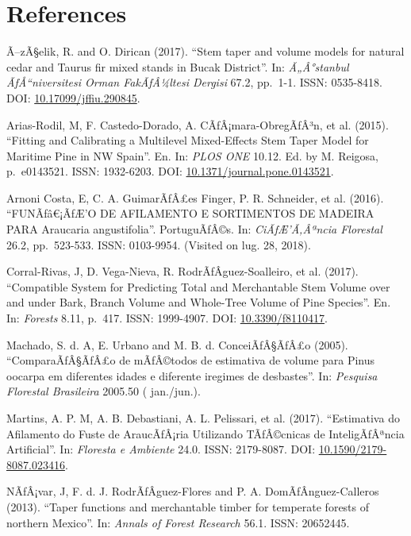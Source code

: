 \documentclass[]{article}
\begin{document}
\clearpage

\hypertarget{references}{%
\section{References}\label{references}}

Ã--zÃ§elik, R. and O. Dirican (2017). ``Stem taper and volume models for
natural cedar and Taurus fir mixed stands in Bucak District''. In:
\emph{Ã„Â°stanbul ÃƒÅ``niversitesi Orman FakÃƒÂ¼ltesi Dergisi} 67.2,
pp.~1-1. ISSN: 0535-8418. DOI:
\href{https://doi.org/10.17099/jffiu.290845}{10.17099/jffiu.290845}.

Arias-Rodil, M, F. Castedo-Dorado, A. CÃƒÂ¡mara-ObregÃƒÂ³n, et al.
(2015). ``Fitting and Calibrating a Multilevel Mixed-Effects Stem Taper
Model for Maritime Pine in NW Spain''. En. In: \emph{PLOS ONE} 10.12.
Ed. by M. Reigosa, p.~e0143521. ISSN: 1932-6203. DOI:
\href{https://doi.org/10.1371/journal.pone.0143521}{10.1371/journal.pone.0143521}.

Arnoni Costa, E, C. A. GuimarÃƒÂ£es Finger, P. R. Schneider, et al.
(2016). ``FUNÃƒâ€¡ÃƒÆ'O DE AFILAMENTO E SORTIMENTOS DE MADEIRA PARA
Araucaria angustifolia''. PortuguÃƒÂ©s. In: \emph{CiÃƒÆ'Ã‚Âªncia
Florestal} 26.2, pp.~523-533. ISSN: 0103-9954. (Visited on lug. 28,
2018).

Corral-Rivas, J, D. Vega-Nieva, R. RodrÃƒÂ­guez-Soalleiro, et al.
(2017). ``Compatible System for Predicting Total and Merchantable Stem
Volume over and under Bark, Branch Volume and Whole-Tree Volume of Pine
Species''. En. In: \emph{Forests} 8.11, p.~417. ISSN: 1999-4907. DOI:
\href{https://doi.org/10.3390/f8110417}{10.3390/f8110417}.

Machado, S. d. A, E. Urbano and M. B. d. ConceiÃƒÂ§ÃƒÂ£o (2005).
``ComparaÃƒÂ§ÃƒÂ£o de mÃƒÂ©todos de estimativa de volume para Pinus
oocarpa em diferentes idades e diferente iregimes de desbastes''. In:
\emph{Pesquisa Florestal Brasileira} 2005.50 ( jan./jun.).

Martins, A. P. M, A. B. Debastiani, A. L. Pelissari, et al. (2017).
``Estimativa do Afilamento do Fuste de AraucÃƒÂ¡ria Utilizando
TÃƒÂ©cnicas de InteligÃƒÂªncia Artificial''. In: \emph{Floresta e
Ambiente} 24.0. ISSN: 2179-8087. DOI:
\href{https://doi.org/10.1590/2179-8087.023416}{10.1590/2179-8087.023416}.

NÃƒÂ¡var, J, F. d. J. RodrÃƒÂ­guez-Flores and P. A.
DomÃƒÂ­nguez-Calleros (2013). ``Taper functions and merchantable timber
for temperate forests of northern Mexico''. In: \emph{Annals of Forest
Research} 56.1. ISSN: 20652445.
\end{document}
